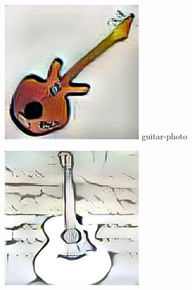 \documentclass{article}
\begin{document}
\begin{figure}[htp]
    \begin{minipage}{0.14285714285714285\linewidth}
        \includegraphics[width=\linewidth]{./classify/derived-files/guitar_photo_0.jpg}
        {guitar-photo}
    \end{minipage}%
    \begin{minipage}{0.14285714285714285\linewidth}
        \includegraphics[width=\linewidth]{./classify/derived-files/guitar_sketch_0.jpg}

\end{minipage}
\end{figure}
\end{document}
